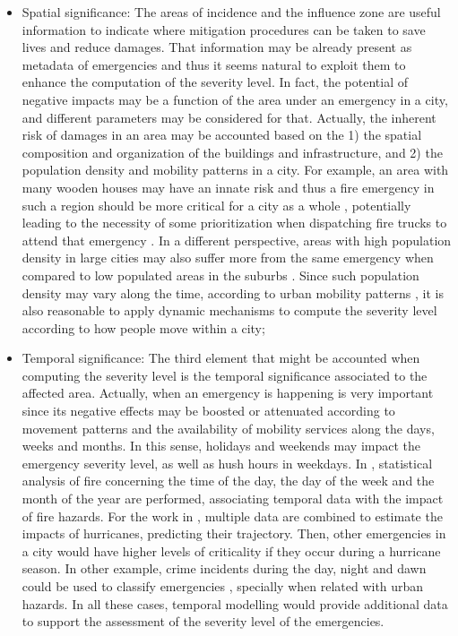 \begin{refsection}
\begin{itemize}
  \item Spatial significance: The areas of incidence and the influence zone are useful information to indicate where mitigation procedures can be taken to save lives and reduce damages. That information may be already present as metadata of emergencies and thus it seems natural to exploit them to enhance the computation of the severity level. In fact, the potential of negative impacts may be a function of the area under an emergency in a city, and different parameters may be considered for that. Actually, the inherent risk of damages in an area may be accounted based on the 1) the spatial composition and organization of the buildings and infrastructure, and 2) the population density and mobility patterns in a city. For example, an area with many wooden houses may have an innate risk \cite{firespatial1} and thus a fire emergency in such a region should be more critical for a city as a whole \cite{firespatial2}, potentially leading to the necessity of some prioritization when dispatching fire trucks to attend that emergency \cite{costa2020automatic}. In a different perspective, areas with high population density in large cities may also suffer more from the same emergency when compared to low populated areas in the suburbs \cite{firespatial3}. Since such population density may vary along the time, according to urban mobility patterns \cite{mobilityEmergencies1}, it is also reasonable to apply dynamic mechanisms to compute the severity level according to how people move within a city;

  \item Temporal significance: The third element that might be accounted when computing the severity level is the temporal significance associated to the affected area. Actually, when an emergency is happening is very important since its negative effects may be boosted or attenuated according to movement patterns and the availability of mobility services along the days, weeks and months. In this sense, holidays and weekends may impact the emergency severity level, as well as hush hours in weekdays. In \cite{firetemporaldata1}, statistical analysis of fire concerning the time of the day, the day of the week and the month of the year are performed, associating temporal data with the impact of fire hazards. For the work in \cite{hurricanetemporal1}, multiple data are combined to estimate the impacts of hurricanes, predicting their trajectory. Then, other emergencies in a city would have higher levels of criticality if they occur during a hurricane season. In other example, crime incidents during the day, night and dawn could be used to classify emergencies \cite{crimetemporal1}, specially when related with urban hazards. In all these cases, temporal modelling would provide additional data to support the assessment of the severity level of the emergencies.
\end{itemize}


\end{refsection}
